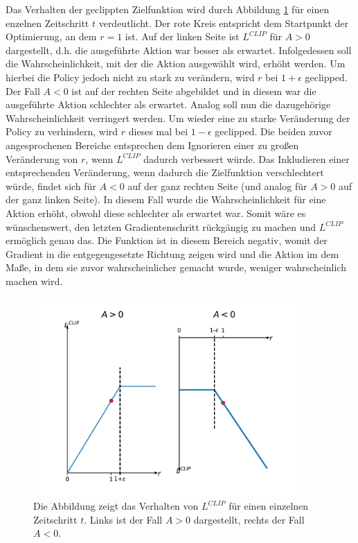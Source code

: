 Das Verhalten der geclippten Zielfunktion wird durch Abbildung \ref{fig_L_clip} für einen enzelnen Zeitschritt $t$ verdeutlicht. Der rote Kreis entspricht dem Startpunkt der Optimierung, an dem $r = 1$ ist. Auf der linken Seite ist $L^{CLIP}$ für $A > 0$ dargestellt, d.h. die ausgeführte Aktion war besser als erwartet. Infolgedessen soll die Wahrscheinlichkeit, mit der die Aktion ausgewählt wird, erhöht werden. Um hierbei die Policy jedoch nicht zu stark zu verändern, wird $r$ bei $1+\epsilon$ geclipped. Der Fall $A < 0$ ist auf der rechten Seite abgebildet und in diesem war die ausgeführte Aktion schlechter als erwartet. Analog soll nun die dazugehörige Wahrscheinlichkeit verringert werden. Um wieder eine zu starke Veränderung der Policy zu verhindern, wird $r$ dieses mal bei $1-\epsilon$ geclipped. Die beiden zuvor angesprochenen Bereiche entsprechen dem Ignorieren einer zu großen Veränderung von $r$, wenn $L^{CLIP}$ dadurch verbessert würde. Das Inkludieren einer entsprechenden Veränderung, wenn dadurch die Zielfunktion verschlechtert würde, findet sich für $A < 0$ auf der ganz rechten Seite (und analog für $A > 0$ auf der ganz linken Seite). In diesem Fall wurde die Wahrscheinlichkeit für eine Aktion erhöht, obwohl diese schlechter als erwartet war. Somit wäre es wünschenswert, den letzten Gradientenschritt rückgängig zu machen und $L^{CLIP}$ ermöglich genau das. Die Funktion ist in diesem Bereich negativ, womit der Gradient in die entgegengesetzte Richtung zeigen wird und die Aktion im dem Maße, in dem sie zuvor wahrscheinlicher gemacht wurde, weniger wahrscheinlich machen wird. \\

\begin{figure}[ht!]
  \centering
  \includegraphics[height=0.5\textwidth, width=0.9\textwidth]{abbildungen/L_clip.pdf}
  \caption{Die Abbildung zeigt das Verhalten von $L^{CLIP}$ für einen einzelnen Zeitschritt $t$. Links ist der Fall $A > 0$ dargestellt, rechts der Fall $A < 0$.}
  \label{fig_L_clip}
\end{figure}

